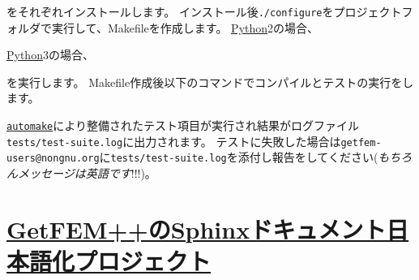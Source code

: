 \documentclass{../../style/ltjoc}
\begin{document}
をそれぞれインストールします。
インストール後\texttt{./configure}をプロジェクトフォルダで実行して、Makefileを作成します。
\href{https://www.python.org/}{Python}2の場合、
\begin{shbox}
\end{shbox}
\href{https://www.python.org/}{Python}3の場合、
\begin{shbox}
\end{shbox}
を実行します。
Makefile作成後以下のコマンドでコンパイルとテストの実行をします。
\begin{shbox}
\end{shbox}
\href{https://www.gnu.org/software/automake/}{\texttt{automake}}により整備されたテスト項目が実行され結果がログファイル\texttt{tests/test-suite.log}に出力されます。
テストに失敗した場合は\texttt{getfem-users@nongnu.org}に\texttt{tests/test-suite.log}を添付し報告をしてください(\emph{もちろんメッセージは英語です}!!!)。

\section{\href{http://www.sphinx-doc.org/ja/stable/intl.html}{GetFEM++のSphinxドキュメント日本語化プロジェクト}}
\end{document}
